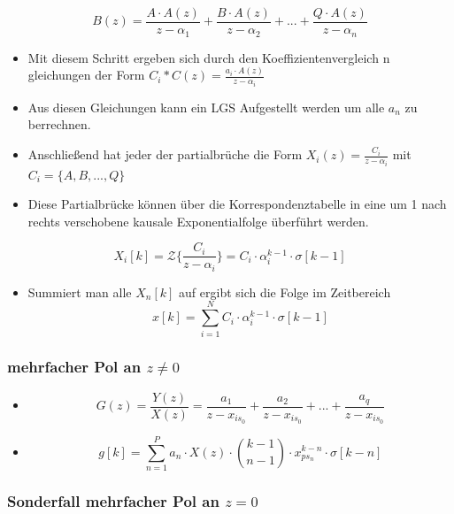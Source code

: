 \documentclass[11pt]{article}
\providecommand{\tightlist}{%
      \setlength{\itemsep}{0pt}\setlength{\parskip}{0pt}}
\begin{document}
\[ B(z) = \frac{A\cdot A(z)}{z-\alpha_1} + \frac{B\cdot A(z)}{z-\alpha_2} + ... + \frac{Q\cdot A(z)}{z-\alpha_n}\]

\begin{itemize}
\item
  Mit diesem Schritt ergeben sich durch den Koeffizientenvergleich n
  gleichungen der Form \(C_i * C(z) = \frac{a_i\cdot A(z)}{z-\alpha_i}\)
\item
  Aus diesen Gleichungen kann ein LGS Aufgestellt werden um alle \(a_n\)
  zu berrechnen.
\item
  Anschließend hat jeder der partialbrüche die Form
  \(X_i(z) = \frac{C_i}{z-\alpha_i}\) mit \(C_i = \{A, B, ..., Q\}\)
\item
  Diese Partialbrücke können über die Korrespondenztabelle in eine um 1
  nach rechts verschobene kausale Exponentialfolge überführt werden.
\end{itemize}

\[X_i[k] = \mathcal{Z}\big\{\frac{C_i}{z-\alpha_i}\big\} = C_i \cdot \alpha_i^{k-1} \cdot \sigma[k-1]\]

\begin{itemize}
\tightlist
\item
  Summiert man alle \(X_n[k]\) auf ergibt sich die Folge im Zeitbereich
  \[x[k] = \sum_{i=1}^N C_i \cdot \alpha_i^{k-1} \cdot \sigma[k-1]\]
\end{itemize}

    \subsubsection{\texorpdfstring{mehrfacher Pol an
\(z \neq 0\)}{mehrfacher Pol an z \textbackslash{}neq 0}}\label{mehrfacher-pol-an-z-neq-0}

\begin{itemize}
\item
  \[G(z) = \frac{Y(z)}{X(z)} = \frac{a_1}{z-x_{is_0}} + \frac{a_2}{z-x_{is_0}} + ... + \frac{a_q}{z-x_{is_0}}\]
\item
  \[g[k] = \sum_{n=1}^P a_n\cdot X(z) \cdot \binom{k-1}{n-1} \cdot x_{ps_n}^{k-n} \cdot \sigma[k-n]\]
\end{itemize}

    \subsubsection{\texorpdfstring{Sonderfall mehrfacher Pol an
\(z = 0\)}{Sonderfall mehrfacher Pol an z = 0}}\label{sonderfall-mehrfacher-pol-an-z-0}
\end{document}
